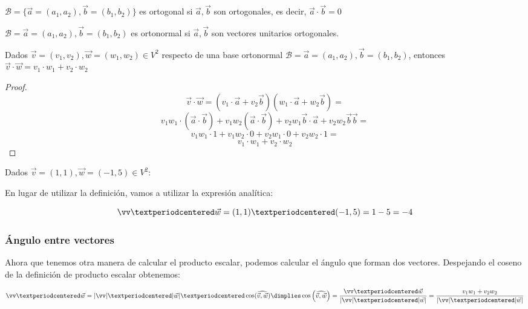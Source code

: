 \begin{defn}
$\mathcal{B} = \{\vec{a}=(a_1,a_2),\vec{b}=(b_1,b_2)\}$ es ortogonal si $\vec{a},\vec{b}$ son ortogonales, es decir, $\vec{a}\cdot\vec{b} = 0$ 
\end{defn}

\begin{defn}
$\mathcal{B} = \vec{a}=(a_1,a_2),\vec{b}=(b_1,b_2)$ es ortonormal si $\vec{a},\vec{b}$ son vectores unitarios ortogonales.
\end{defn}



\begin{prop}

Dados $\vec{v}=(v_1,v_2),\vec{w}=(w_1,w_2)\in V^2$ respecto de una base ortonormal $\mathcal{B} = \vec{a}=(a_1,a_2),\vec{b}=(b_1,b_2)$, entonces $\vec{v}·\vec{w} = v_1·w_1 + v_2·w_2$
\end{prop}

\begin{proof}
\[
\vec{v}·\vec{w} = (v_1·\vec{a} + v_2\vec{b})(w_1·\vec{a} + w_2\vec{b}) =\]
\[  
v_1w_1·(\vec{a}·\vec{b}) + v_1w_2(\vec{a}·\vec{b}) + v_2w_1\vec{b}·\vec{a} + v_2w_2\vec{b}\vec{b} = \]
\[
v_1w_1·1 + v_1w_2·0 + v_2w_1·0 + v_2w_2·1 = \]
\[
v_1·w_1 + v_2·w_2
\]

\end{proof}


\begin{example}
Dados $\vec{v}=(1,1),\vec{w}=(-1,5) \in V^2$:

En lugar de utilizar la definición, vamos a utilizar la expresión analítica:

\[\vv·\vec{w} = (1,1)·(-1,5) = 1-5= -4\]
\end{example}


\subsubsection{Ángulo entre vectores}

Ahora que tenemos otra manera de calcular el producto escalar, podemos calcular el ángulo que forman dos vectores. Despejando el coseno de la definición de producto escalar obtenemos:

\[\vv·\vec{w} = |\vv|·|\vec{w}|·\cos(\widehat{\vec{v},\vec{w}})\dimplies\cos\left(\widehat{\vec{v},\vec{w}}\right)=\frac{\vv·\vec{w}}{|\vv|·|\vec{w}|} = \frac{v_1w_1+v_2w_2}{|\vv|·|\vec{w}|}\]



